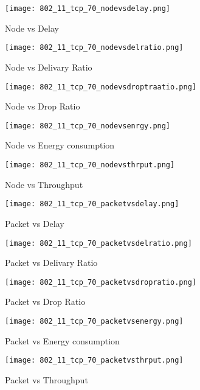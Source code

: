 \documentclass{report}
\begin{document}
\begin{figure}
  \caption{Node vs Delay}
  \centering
    \texttt{[image: 802\_11\_tcp\_70\_nodevsdelay.png]}
\end{figure}
\begin{figure}
  \caption{Node vs Delivary Ratio}
  \centering
    \texttt{[image: 802\_11\_tcp\_70\_nodevsdelratio.png]}
\end{figure}
\begin{figure}
  \caption{Node vs Drop Ratio}
  \centering
    \texttt{[image: 802\_11\_tcp\_70\_nodevsdroptraatio.png]}
\end{figure}
\begin{figure}
  \caption{Node vs Energy consumption}
  \centering
    \texttt{[image: 802\_11\_tcp\_70\_nodevsenrgy.png]}
\end{figure}
\begin{figure}
  \caption{Node vs Throughput}
  \centering
    \texttt{[image: 802\_11\_tcp\_70\_nodevsthrput.png]}
\end{figure}

\begin{figure}
  \caption{Packet vs Delay}
  \centering
    \texttt{[image: 802\_11\_tcp\_70\_packetvsdelay.png]}
\end{figure}
\begin{figure}
  \caption{Packet vs Delivary Ratio}
  \centering
    \texttt{[image: 802\_11\_tcp\_70\_packetvsdelratio.png]}
\end{figure}
\begin{figure}
  \caption{Packet vs Drop Ratio}
  \centering
    \texttt{[image: 802\_11\_tcp\_70\_packetvsdropratio.png]}
\end{figure}
\begin{figure}
  \caption{Packet vs Energy consumption}
  \centering
    \texttt{[image: 802\_11\_tcp\_70\_packetvsenergy.png]}
\end{figure}
\begin{figure}
  \caption{Packet vs Throughput}
  \centering
    \texttt{[image: 802\_11\_tcp\_70\_packetvsthrput.png]}
\end{figure}
\end{document}
